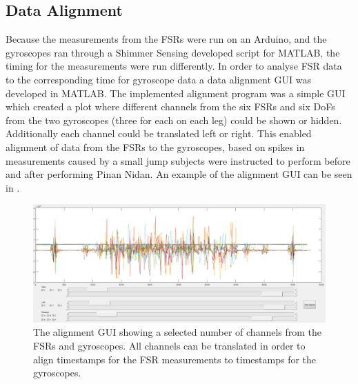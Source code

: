 \subsection{Data Alignment}
Because the measurements from the FSRs were run on an Arduino, and the gyroscopes ran through a Shimmer Sensing developed script for MATLAB, the timing for the measurements were run differently. In order to analyse FSR data to the corresponding time for gyroscope data a data alignment GUI was developed in MATLAB. The implemented alignment program was a simple GUI which created a plot where different channels from the six FSRs and six DoFs from the two gyroscopes (three for each on each leg) could be shown or hidden. Additionally each channel could be translated left or right. This enabled alignment of data from the FSRs to the gyroscopes, based on spikes in measurements caused by a small jump subjects were instructed to perform before and after performing Pinan Nidan. An example of the alignment GUI can be seen in .

\begin{figure}[H]
	\includegraphics[width=1\textwidth]{figures/alignGUI}
	\caption{The alignment GUI showing a selected number of channels from the FSRs and gyroscopes. All channels can be translated in order to align timestamps for the FSR measurements to timestamps for the gyroscopes.}
	\label{fig:alignGUI}  %
\end{figure}


